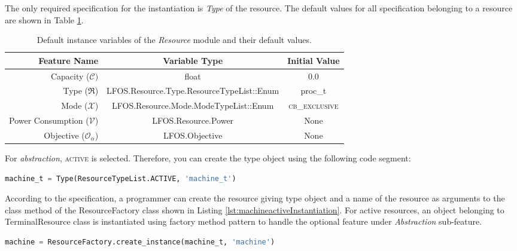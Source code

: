 \documentclass[]{scrartcl}
\begin{document}
The only required specification for the instantiation is \emph{Type} of the resource. The default values for all specification belonging to a resource are
shown in Table \ref{tab:resource_vars_default}.

\begin{table}[!htb]
	\centering
	\begin{tabular}{r || c | c |}
		\hline
		\textbf{Feature Name} & \textbf{Variable Type} & \textbf{Initial Value} \\ \hline \hline
		Capacity ($\mathcal{C})$ & float & $0.0$ \\ \hline
		Type ($\Re$) & LFOS.Resource.Type.ResourceTypeList::Enum & \textsf{proc\_t} \\ \hline
		Mode ($\mathcal{X}$) & LFOS.Resource.Mode.ModeTypeList::Enum & \textsc{cb\_exclusive} \\ \hline
		Power Consumption ($\mathcal{V}$) & LFOS.Resource.Power & \textsf{None} \\ \hline
		Objective ($\mathcal{O}_{\alpha}$) & LFOS.Objective & \textsf{None} \\ \hline
	\end{tabular}
	\caption{Default instance variables of the \emph{Resource} module and their default values.}
	\label{tab:resource_vars_default}
\end{table}

            
For \emph{abstraction}, \textsc{active} is selected. Therefore, you can create the type object using the following code segment:

\begin{lstlisting}[language=Python, frame=single, label={lst:activeType}, caption={Active resource type object instantiation}]
machine_t = Type(ResourceTypeList.ACTIVE, 'machine_t')
\end{lstlisting}
        
        
According to the specification, a programmer can create the resource giving type object and a name of the resource as arguments to the class method of the
ResourceFactory class shown in Listing \ref{lst:machineactiveInstantiation}. For active resources, an object belonging to \textsf{TerminalResource} class is instantiated
using factory method pattern to handle the optional feature under \emph{Abstraction} sub-feature.


\begin{lstlisting}[language=Python, frame=single, label={lst:machineactiveInstantiation}, caption={Active resource instantiation using ResourceFactory class}]
machine = ResourceFactory.create_instance(machine_t, 'machine')
\end{lstlisting}
        
\end{document}

